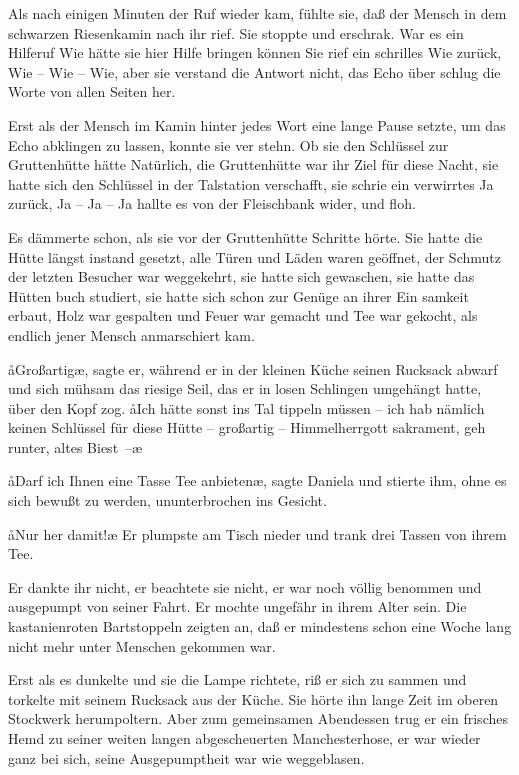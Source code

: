 Als nach einigen Minuten der Ruf wieder kam, fühlte sie, daß
der Mensch in dem schwarzen Riesenkamin nach ihr rief. Sie
stoppte und erschrak. War es ein Hilferuf\frag{} Wie hätte sie hier
Hilfe bringen können\frag{} Sie rief ein schrilles Wie zurück, Wie --
Wie -- Wie, aber sie verstand die Antwort nicht, das Echo über\-%
schlug die Worte von allen Seiten her.

Erst als der Mensch im Kamin hinter jedes Wort eine lange
Pause setzte, um das Echo abklingen zu lassen, konnte sie ver\-%
stehn. Ob sie den Schlüssel zur Gruttenhütte hätte\frag{} Natürlich,
die Gruttenhütte war ihr Ziel für diese Nacht, sie hatte sich den
Schlüssel in der Talstation verschafft, sie schrie ein verwirrtes Ja
zurück, Ja -- Ja -- Ja hallte es von der Fleischbank wider,
und floh.

Es dämmerte schon, als sie vor der Gruttenhütte Schritte
hörte. Sie hatte die Hütte längst instand gesetzt, alle Türen
und Läden waren geöffnet, der Schmutz der letzten Besucher
war weggekehrt, sie hatte sich gewaschen, sie hatte das Hütten\-%
buch studiert, sie hatte sich schon zur Genüge an ihrer Ein\-%
samkeit erbaut, Holz war gespalten und Feuer war gemacht
und Tee war gekocht, als endlich jener Mensch anmarschiert
kam.

\aa Großartig\ae, sagte er, während er in der kleinen Küche seinen
Rucksack abwarf und sich mühsam das riesige Seil, das er in
losen Schlingen umgehängt hatte, über den Kopf zog. \aa Ich
hätte sonst ins Tal tippeln müssen -- ich hab nämlich keinen
Schlüssel für diese Hütte -- großartig -- Himmelherrgott\-%
sakrament, geh runter, altes Biest~--\ae

\aa Darf ich Ihnen eine Tasse Tee anbieten\ae, sagte Daniela und
stierte ihm, ohne es sich bewußt zu werden, ununterbrochen
ins Gesicht.

\aa Nur her damit!\ae{} Er plumpste am Tisch nieder und trank drei
Tassen von ihrem Tee.

Er dankte ihr nicht, er beachtete sie nicht, er war noch völlig
benommen und ausgepumpt von seiner Fahrt. Er mochte
ungefähr in ihrem Alter sein. Die kastanienroten Bartstoppeln
zeigten an, daß er mindestens schon eine Woche lang nicht
mehr unter Menschen gekommen war.

Erst als es dunkelte und sie die Lampe richtete, riß er sich zu\-%
sammen und torkelte mit seinem Rucksack aus der Küche. Sie
hörte ihn lange Zeit im oberen Stockwerk herumpoltern.
Aber zum gemeinsamen Abendessen trug er ein frisches Hemd
zu seiner weiten langen abgescheuerten Manchesterhose, er
war wieder ganz bei sich, seine Ausgepumptheit war wie
weggeblasen.

